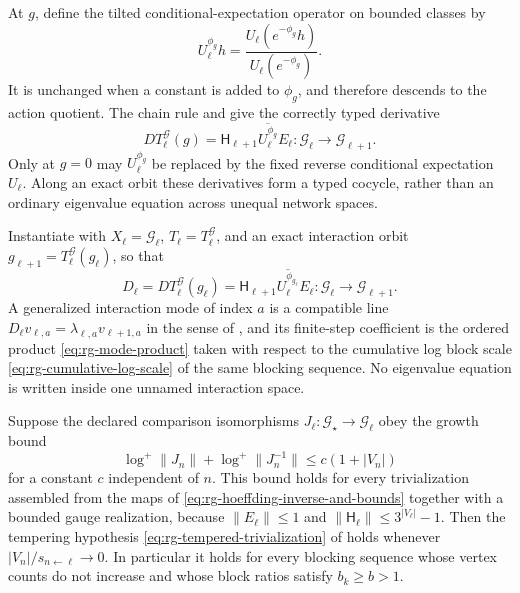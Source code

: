 At \(g\), define the tilted conditional-expectation operator on bounded
classes by
\begin{equation}
 U_\ell^{\phi_g}h
 =\frac{U_\ell(e^{-\phi_g}h)}{U_\ell(e^{-\phi_g})}.
 \label{eq:rg-interaction-tilted-conditional-expectation}
\end{equation}
It is unchanged when a constant is added to \(\phi_g\), and therefore
descends to the action quotient.  The chain rule and
 give the correctly typed derivative
\begin{equation}
 D T_\ell^{\mathcal G}(g)
 =\mathsf H_{\ell+1} \overline{U_\ell^{\phi_g}} E_\ell:
 \mathcal G_\ell\longrightarrow\mathcal G_{\ell+1}.
 \label{eq:rg-nonlinear-interaction-derivative}
\end{equation}
Only at \(g=0\) may \(U_\ell^{\phi_g}\) be replaced by the fixed reverse
conditional expectation \(U_\ell\).  Along an exact orbit these derivatives
form a typed cocycle, rather than an ordinary eigenvalue equation across
unequal network spaces. 

Instantiate  with \(X_\ell=\mathcal G_\ell\),
\(T_\ell=T_\ell^{\mathcal G}\), and an exact interaction orbit
\(g_{\ell+1}=T_\ell^{\mathcal G}(g_\ell)\), so that
\begin{equation}
 D_\ell=DT_\ell^{\mathcal G}(g_\ell)
 =\mathsf H_{\ell+1}\overline{U_\ell^{\phi_{g_\ell}}}E_\ell:
 \mathcal G_\ell\longrightarrow\mathcal G_{\ell+1}.
 \label{eq:rg-interaction-mode-generator}
\end{equation}
A generalized interaction mode of index \(a\) is a compatible line
\(D_\ell v_{\ell,a}=\lambda_{\ell,a}v_{\ell+1,a}\) in the sense of
, and its finite-step coefficient is the ordered product
\eqref{eq:rg-mode-product} taken with respect to the cumulative log block scale
\eqref{eq:rg-cumulative-log-scale} of the same blocking sequence.  No eigenvalue
equation is written inside one unnamed interaction space.

Suppose the declared comparison isomorphisms
\(J_\ell:\mathcal G_\star\to\mathcal G_\ell\) obey the growth bound
\begin{equation}
 \log^+\lVert J_n\rVert+\log^+\lVert J_n^{-1}\rVert
 \leq c\left(1+\lvert V_n\rvert\right)
 \label{eq:rg-interaction-trivialization-growth}
\end{equation}
for a constant \(c\) independent of \(n\).  This bound holds for every
trivialization assembled from the maps of
\eqref{eq:rg-hoeffding-inverse-and-bounds} together with a bounded gauge
realization, because \(\lVert E_\ell\rVert\leq1\) and
\(\lVert\mathsf H_\ell\rVert\leq3^{\lvert V_\ell\rvert}-1\).  Then the tempering
hypothesis \eqref{eq:rg-tempered-trivialization} of
 holds whenever
\(\lvert V_n\rvert/s_{n\leftarrow\ell}\to0\).  In particular it holds for every
blocking sequence whose vertex counts do not increase and whose block ratios
satisfy \(b_k\geq b>1\). 

